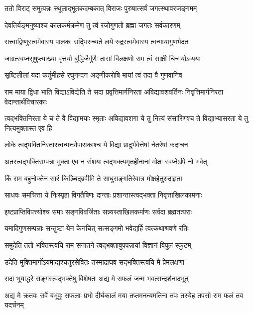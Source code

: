 \twolineshloka
{ततो विराट् समुत्पन्नः स्थूलाद्भूतकदम्बकात्}
{विराजः पुरुषात्सर्वं जगत्स्थावरजङ्गमम्} %

\twolineshloka
{देवतिर्यङ्मनुष्याश्च कालकर्मक्रमेण तु}
{त्वं रजोगुणतो ब्रह्मा जगतः सर्वकारणम्} %

\twolineshloka
{सत्त्वाद्विष्णुस्त्वमेवास्य पालकः सद्भिरुच्यते}
{लये रुद्रस्त्वमेवास्य त्वन्मायागुणभेदतः} %

\twolineshloka
{जाग्रत्स्वप्नसुषुप्त्याख्या वृत्तयो बुद्धिजैर्गुणैः}
{तासां विलक्षणो राम त्वं साक्षी चिन्मयोऽव्ययः} %

\twolineshloka
{सृष्टिलीलां यदा कर्तुमीहसे रघुनन्दन}
{अङ्गीकरोषि मायां त्वं तदा वै गुणवानिव} %

\threelineshloka
{राम माया द्विधा भाति विद्याऽविद्येति ते सदा}
{प्रवृत्तिमार्गनिरता अविद्यावशवर्तिनः}
{निवृत्तिमार्गनिरता वेदान्तार्थविचारकाः} %

\threelineshloka
{त्वद्भक्तिनिरता ये च ते वै विद्यामयाः स्मृताः}
{अविद्यावशगा ये तु नित्यं संसारिणश्च ते}
{विद्याभ्यासरता ये तु नित्यमुक्तास्त एव हि} %

\twolineshloka
{लोके त्वद्भक्तिनिरतास्त्वन्मन्त्रोपासकाश्च ये}
{विद्या प्रादुर्भवेत्तेषां नेतरेषां कदाचन} %

\twolineshloka
{अतस्त्वद्भक्तिसम्पन्ना मुक्ता एव न संशयः}
{त्वद्भक्त्यमृतहीनानां मोक्षः स्वप्नेऽपि नो भवेत्} %

\twolineshloka
{किं राम बहुनोक्तेन सारं किञ्चिद्ब्रवीमि ते}
{साधुसङ्गतिरेवात्र मोक्षहेतुरुदाहृता} %

\twolineshloka
{साधवः समचित्ता ये निःस्पृहा विगतैषिणः}
{दान्ताः प्रशान्तास्त्वद्भक्ता निवृत्ताखिलकामनाः} %

\twolineshloka
{इष्टप्राप्तिविपत्त्योश्च समाः सङ्गविवर्जिताः}
{सन्न्यस्ताखिलकर्माणः सर्वदा ब्रह्मतत्पराः} %

\twolineshloka
{यमादिगुणसम्पन्नाः सन्तुष्टा येन केनचित्}
{सत्सङ्गमो भवेद्यर्हि त्वत्कथाश्रवणे रतिः} %

\twolineshloka
{समुदेति ततो भक्तिस्त्वयि राम सनातने}
{त्वद्भक्तावुपपन्नायां विज्ञानं विपुलं स्फुटम्} %

\twolineshloka
{उदेति मुक्तिमार्गोऽयमाद्यश्चतुरसेवितः}
{तस्माद्राघव सद्भक्तिस्त्वयि मे प्रेमलक्षणा} %

\twolineshloka
{सदा भूयाद्धरे सङ्गस्त्वद्भक्तेषु विशेषतः}
{अद्य मे सफलं जन्म भवत्सन्दर्शनादभूत्} %

\threelineshloka
{अद्य मे क्रतवः सर्वे बभूवुः सफलाः प्रभो}
{दीर्घकालं मया तप्तमनन्यमतिना तपः}
{तस्येह तपसो राम फलं तव यदर्चनम्} %

